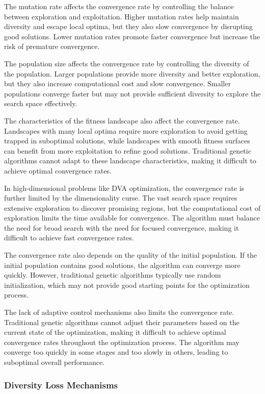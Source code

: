 \documentclass[12pt,a4paper]{article}
\begin{document}
The mutation rate affects the convergence rate by controlling the balance between exploration and exploitation. Higher mutation rates help maintain diversity and escape local optima, but they also slow convergence by disrupting good solutions. Lower mutation rates promote faster convergence but increase the risk of premature convergence.

The population size affects the convergence rate by controlling the diversity of the population. Larger populations provide more diversity and better exploration, but they also increase computational cost and slow convergence. Smaller populations converge faster but may not provide sufficient diversity to explore the search space effectively.

The characteristics of the fitness landscape also affect the convergence rate. Landscapes with many local optima require more exploration to avoid getting trapped in suboptimal solutions, while landscapes with smooth fitness surfaces can benefit from more exploitation to refine good solutions. Traditional genetic algorithms cannot adapt to these landscape characteristics, making it difficult to achieve optimal convergence rates.

In high-dimensional problems like DVA optimization, the convergence rate is further limited by the dimensionality curse. The vast search space requires extensive exploration to discover promising regions, but the computational cost of exploration limits the time available for convergence. The algorithm must balance the need for broad search with the need for focused convergence, making it difficult to achieve fast convergence rates.

The convergence rate also depends on the quality of the initial population. If the initial population contains good solutions, the algorithm can converge more quickly. However, traditional genetic algorithms typically use random initialization, which may not provide good starting points for the optimization process.

The lack of adaptive control mechanisms also limits the convergence rate. Traditional genetic algorithms cannot adjust their parameters based on the current state of the optimization, making it difficult to achieve optimal convergence rates throughout the optimization process. The algorithm may converge too quickly in some stages and too slowly in others, leading to suboptimal overall performance.

\subsubsection{Diversity Loss Mechanisms}
\end{document}
